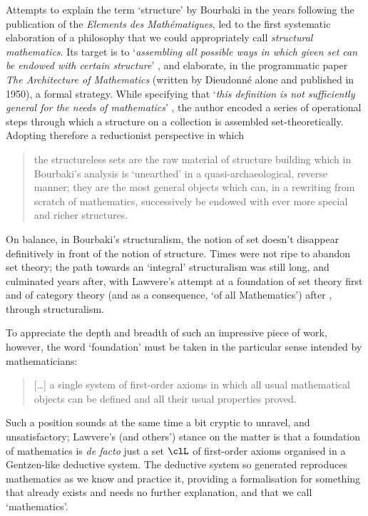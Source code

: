 Attempts to explain the term `structure' by Bourbaki in the years following the publication of the \textit{Elements des Mathématiques}, led to the first systematic elaboration of a philosophy that we could appropriately call \textit{structural mathematics}. Its target is to `\textit{assembling all possible ways in which given set can be endowed with certain structure}' \cite{kromer2007tool}, and elaborate, in the programmatic paper \textit{The Architecture of Mathematics} (written by Dieudonné alone and published in 1950), a formal strategy. While specifying that `\textit{this definition is not sufficiently general for the needs of mathematics}' \cite{Bourb50}, the author encoded a series of operational steps through which a structure on a collection is assembled set-theoretically. Adopting therefore a reductionist perspective in which
\begin{quote}
    the structureless sets are the raw material of structure building which in Bourbaki’s analysis is `unearthed' in a quasi-archaeological, reverse manner; they are the most general objects which can, in a rewriting from scratch of mathematics, successively be endowed with ever more special and richer structures.\hfill  \cite{kromer2007tool}
\end{quote}
On balance, in Bourbaki's structuralism, the notion of set doesn't disappear definitively in front of the notion of structure. Times were not ripe to abandon set theory; the path towards an `integral' structuralism was still long, and culminated years after, with Lawvere's attempt at a foundation  of set theory first \cite{lawvere1964elementary} and  of category theory (and as a consequence, `of all Mathematics') after \cite{lajolla}, through structuralism.

To appreciate the depth and breadth of such an impressive piece of work, however, the word `foundation' must be taken in the particular sense intended by mathematicians:
\begin{quote}
    [\dots\unkern] a single system of first-order axioms in which all usual mathematical objects can be defined and all their usual properties proved.
\end{quote}
Such a position sounds at the same time a bit cryptic to unravel, and unsatisfactory; Lawvere's (and others') stance on the matter is that a foundation of mathematics is \emph{de facto} just a set $\clL$ of first-order axioms organised in a Gentzen-like deductive system. The deductive system so generated reproduces mathematics as we know and practice it, providing a formalisation for something that already exists and needs no further explanation, and that we call `mathematics'.

